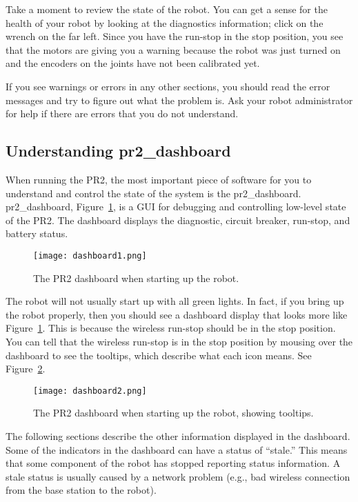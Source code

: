 Take a moment to review the state of the robot. You can get a sense for the health of 
your robot by looking at the diagnostics information; click on the wrench on the far left.  Since you have the run-stop in the
stop position, you see that the motors are giving you a warning because the robot was just turned on and the encoders on the joints have not 
been calibrated yet. 

If you see warnings or errors in any other sections, you should read the error messages and try to figure out what the 
problem is.  Ask your robot administrator for help if there are errors that you do not understand.
\subsection{Understanding pr2\_dashboard}
When running the PR2, the most important piece of software for you to understand and control the state of the system is 
the pr2\_dashboard. pr2\_dashboard, Figure~\ref{fig:dashboard1}, is a GUI for debugging and controlling low-level state 
of the PR2. The dashboard displays the diagnostic, circuit breaker, run-stop, and battery status.
\begin{figure}[h]
\centering
\texttt{[image: dashboard1.png]}
\caption{The PR2 dashboard when starting up the robot.}
\label{fig:dashboard1}
\end{figure}
The robot will not usually start up with all green lights. In fact, if you bring up the robot properly, then you should see a dashboard display that looks more like Figure~\ref{fig:dashboard1}.
This is because the wireless run-stop should be in the stop position.
You can tell that the wireless run-stop is in the stop position by mousing over the dashboard to see the tooltips, which describe what each icon means. See Figure~\ref{fig:dashboard2}.

\begin{figure}[h]
\centering
\texttt{[image: dashboard2.png]}
\caption{The PR2 dashboard when starting up the robot, showing tooltips.}
\label{fig:dashboard2}
\end{figure}

The following sections describe the other information displayed in the
dashboard.  Some of the indicators in the dashboard can have a status
of ``stale.''  This means that some component of the robot has stopped
reporting status information.  A stale status is usually caused by a
network problem (e.g., bad wireless connection from the base station to the
robot).


